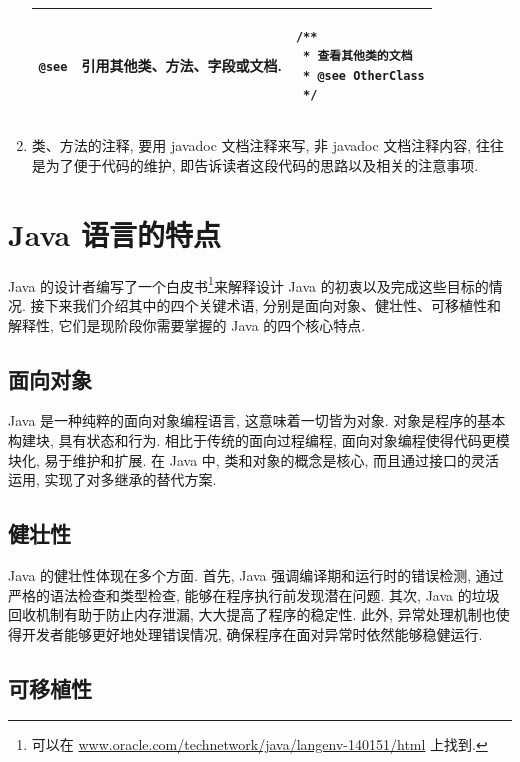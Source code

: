 \documentclass[10pt,UTF8]{book} %
\begin{document}
\begin{enumerate}
\begin{table}[H]
\begin{tabular}{p{2.5cm} p{5cm} p{7cm}}
                                    \hline
            \lstinline|@see| & 引用其他类、方法、字段或文档.  & 
            \begin{lstlisting}
/**
 * 查看其他类的文档
 * @see OtherClass
 */
            \end{lstlisting} \\
                           \hline
        \end{tabular}
        \label{tab:javadoc-tags}
    \end{table}
    \item 类、方法的注释, 要用 javadoc 文档注释来写, 非 javadoc 文档注释内容,
    往往是为了便于代码的维护, 即告诉读者这段代码的思路以及相关的注意事项.
\end{enumerate}

\section{Java 语言的特点}

Java 的设计者编写了一个白皮书\footnote{可以在 
\url{www.oracle.com/technetwork/java/langenv-140151/html} 上找到.}来解释设计 
Java 的初衷以及完成这些目标的情况. 接下来我们介绍其中的四个关键术语, 
分别是面向对象、健壮性、可移植性和解释性, 它们是现阶段你需要掌握的 Java 的四个核心特点.

\subsection{面向对象}

Java 是一种纯粹的面向对象编程语言, 这意味着一切皆为对象. 对象是程序的基本构建块, 具有状态和行为. 
相比于传统的面向过程编程, 面向对象编程使得代码更模块化, 易于维护和扩展. 在 Java 中, 
类和对象的概念是核心, 而且通过接口的灵活运用, 实现了对多继承的替代方案. 

\subsection{健壮性}

Java 的健壮性体现在多个方面. 首先, Java 强调编译期和运行时的错误检测, 
通过严格的语法检查和类型检查, 能够在程序执行前发现潜在问题. 其次, 
Java 的垃圾回收机制有助于防止内存泄漏, 大大提高了程序的稳定性. 此外, 
异常处理机制也使得开发者能够更好地处理错误情况, 确保程序在面对异常时依然能够稳健运行. 

\subsection{可移植性}
\end{document}

